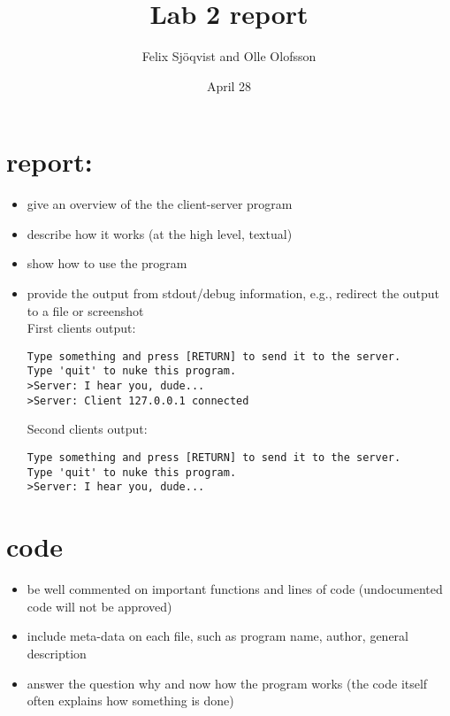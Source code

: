 \documentclass{article}
\title{Lab 2 report}
\author{Felix Sjöqvist and Olle Olofsson}
\date{April 28}
\begin{document}
\maketitle
\section{report:}
\begin{itemize}
    \item give an overview of the the client-server program
    \item describe how it works (at the high level, textual)
    \item show how to use the program
    \item provide the output from stdout/debug information, e.g., redirect the output to a file or screenshot
        \\First clients output:
        \begin {verbatim}
Type something and press [RETURN] to send it to the server.
Type 'quit' to nuke this program.
>Server: I hear you, dude...
>Server: Client 127.0.0.1 connected
        \end{verbatim}
        Second clients output:
        \begin {verbatim}
Type something and press [RETURN] to send it to the server.
Type 'quit' to nuke this program.
>Server: I hear you, dude...
        \end{verbatim}
\end{itemize}
\section{code}
\begin{itemize}
    \item be well commented on important functions and lines of code (undocumented code will not be approved)
    \item include meta-data on each file, such as program name, author, general description
    \item answer the question why and now how the program works (the code itself often explains how something is done)
\end{itemize}
\end{document}
